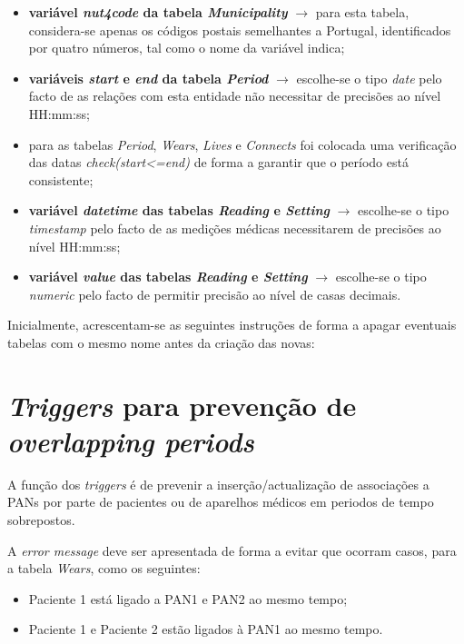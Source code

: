 \documentclass[a4paper]{article}
\begin{document}
\begin{itemize}
  \item \textbf{variável \textit{nut4code} da tabela \textit{Municipality}} $\rightarrow$ para esta tabela, considera-se apenas os códigos postais semelhantes a Portugal, identificados por quatro números, tal como o nome da variável indica;
  
  \item \textbf{variáveis \textit{start} e \textit{end} da tabela \textit{Period}} $\rightarrow$ escolhe-se o tipo \textit{date} pelo facto de as relações com esta entidade não necessitar de precisões ao nível HH:mm:ss;
  
  \item para as tabelas \textit{Period}, \textit{Wears}, \textit{Lives} e \textit{Connects} foi colocada uma verificação das datas \textit{check(start<=end)} de forma a garantir que o período está consistente;

  \item \textbf{variável \textit{datetime} das tabelas \textit{Reading} e \textit{Setting}} $\rightarrow$ escolhe-se o tipo \textit{timestamp} pelo facto de as medições médicas necessitarem de precisões ao nível HH:mm:ss;
  
  \item \textbf{variável \textit{value} das tabelas \textit{Reading} e \textit{Setting}} $\rightarrow$ escolhe-se o tipo \textit{numeric} pelo facto de permitir precisão ao nível de casas decimais.  
\end{itemize}
\pagebreak
Inicialmente, acrescentam-se as seguintes instruções de forma a apagar eventuais tabelas com o mesmo nome antes da criação das novas:



\section{\textit{Triggers} para prevenção de \textit{overlapping periods}}
A função dos \textit{triggers} é de prevenir a inserção/actualização de associações a PANs por parte de pacientes ou de aparelhos médicos em periodos de tempo sobrepostos. 

A \textit{error message} deve ser apresentada de forma a evitar que ocorram casos,  para a tabela \textit{Wears}, como os seguintes:
\vskip 5mm
\begin{itemize}
\item Paciente 1 está ligado a PAN1 e PAN2 ao mesmo tempo;

\item  Paciente 1 e Paciente 2 estão ligados à PAN1 ao mesmo tempo.
\end{itemize}
\end{document}
